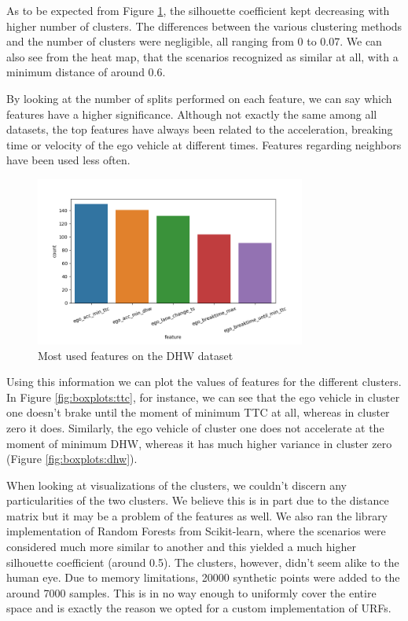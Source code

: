 \documentclass[conference]{IEEEtran}
\begin{document}
As to be expected from Figure \ref{map-dhw}, the silhouette coefficient kept decreasing with higher number of clusters. The differences between the various clustering methods and the number of clusters were negligible, all ranging from 0 to 0.07. We can also see from the heat map, that the scenarios recognized as similar at all, with a minimum distance of around 0.6.

By looking at the number of splits performed on each feature, we can say which features have a higher significance. Although not exactly the same among all datasets, the top features have always been related to the acceleration, breaking time or velocity of the ego vehicle at different times. Features regarding neighbors have been used less often.

\begin{figure}[!h]
  \centering
  \includegraphics[width=3.5in]{./images/features_plot}
  \caption{Most used features on the DHW dataset}
  \label{map-dhw}
\end{figure}

Using this information we can plot the values of features for the different clusters. In Figure \ref{fig:boxplots:ttc}, for instance, we can see that the ego vehicle in cluster one doesn't brake until the moment of minimum TTC at all, whereas in cluster zero it does. Similarly, the ego vehicle of cluster one does not accelerate at the moment of minimum DHW, whereas it has much higher variance in cluster zero (Figure \ref{fig:boxplots:dhw}).

When looking at visualizations of the clusters, we couldn't discern any particularities of the two clusters. We believe this is in part due to the distance matrix but it may be a problem of the features as well. We also ran the library implementation of Random Forests from Scikit-learn, where the scenarios were considered much more similar to another and this yielded a much higher silhouette coefficient (around 0.5). The clusters, however, didn't seem alike to the human eye. Due to memory limitations, 20000 synthetic points were added to the around 7000 samples. This is in no way enough to uniformly cover the entire space and is exactly the reason we opted for a custom implementation of URFs.
\end{document}
